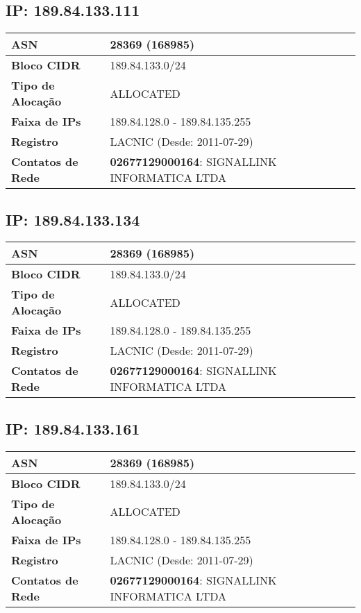     \subsection{IP: 189.84.133.111}
    \begin{tabular}{|l|l|}
    \hline
    \textbf{ASN} & 28369 (168985) \\ \hline
    \textbf{Bloco CIDR} & 189.84.133.0/24 \\ \hline
    \textbf{Tipo de Alocação} & ALLOCATED \\ \hline
    \textbf{Faixa de IPs} & 189.84.128.0 - 189.84.135.255 \\ \hline
    \textbf{Registro} & LACNIC (Desde: 2011-07-29) \\ \hline
        
\textbf{Contatos de Rede} & \textbf{02677129000164}: SIGNALLINK INFORMATICA LTDA 
\\ \hline
\end{tabular}


    \subsection{IP: 189.84.133.134}
    \begin{tabular}{|l|l|}
    \hline
    \textbf{ASN} & 28369 (168985) \\ \hline
    \textbf{Bloco CIDR} & 189.84.133.0/24 \\ \hline
    \textbf{Tipo de Alocação} & ALLOCATED \\ \hline
    \textbf{Faixa de IPs} & 189.84.128.0 - 189.84.135.255 \\ \hline
    \textbf{Registro} & LACNIC (Desde: 2011-07-29) \\ \hline
        
\textbf{Contatos de Rede} & \textbf{02677129000164}: SIGNALLINK INFORMATICA LTDA 
\\ \hline
\end{tabular}


    \subsection{IP: 189.84.133.161}
    \begin{tabular}{|l|l|}
    \hline
    \textbf{ASN} & 28369 (168985) \\ \hline
    \textbf{Bloco CIDR} & 189.84.133.0/24 \\ \hline
    \textbf{Tipo de Alocação} & ALLOCATED \\ \hline
    \textbf{Faixa de IPs} & 189.84.128.0 - 189.84.135.255 \\ \hline
    \textbf{Registro} & LACNIC (Desde: 2011-07-29) \\ \hline
        
\textbf{Contatos de Rede} & \textbf{02677129000164}: SIGNALLINK INFORMATICA LTDA 
\\ \hline
\end{tabular}


